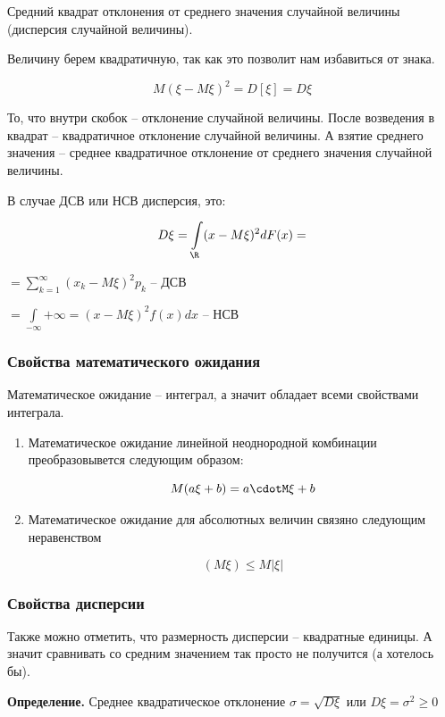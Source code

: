 \documentclass{article}
\begin{document}
Средний квадрат отклонения от среднего значения случайной величины (дисперсия случайной величины).

Величину берем квадратичную, так как это позволит нам избавиться от знака.

$$M(\xi - M\xi)^2 = D[\xi] = D\xi$$

То, что внутри скобок -- отклонение случайной величины. После возведения в квадрат -- квадратичное отклонение случайной величины. А взятие среднего значения -- среднее квадратичное отклонение от среднего значения случайной величины. 

В случае ДСВ или НСВ дисперсия, это:

$$D\xi = \int\limits_{\R} (x - M\xi)^2dF(x) = $$

\qquad$= \sum\limits_{k = 1}^{\infty}(x_k - M\xi)^2 p_k$ -- ДСВ

\qquad$= \int\limits_{-\infty}{+\infty} = (x - M\xi)^2f(x)dx$ -- НСВ

\subsubsection{Свойства математического ожидания}

Математическое ожидание -- интеграл, а значит обладает всеми свойствами интеграла.

\begin{enumerate}

\item Математическое ожидание линейной неоднородной комбинации преобразовывется следующим образом:

$$M(a\xi + b) = a\cdotM\xi + b$$

\item Математическое ожидание для абсолютных величин связяно следующим неравенством

$$(M\xi) \leq M|\xi|$$
\end{enumerate}

\subsubsection{Свойства дисперсии}


Также можно отметить, что размерность дисперсии -- квадратные единицы. А значит сравнивать со средним значением так просто не получится (а хотелось бы).

\textbf{Определение.} Среднее квадратическое отклонение $\sigma = \sqrt{D\xi}$ или $D\xi = \sigma^2 \geq 0$
\end{document}
